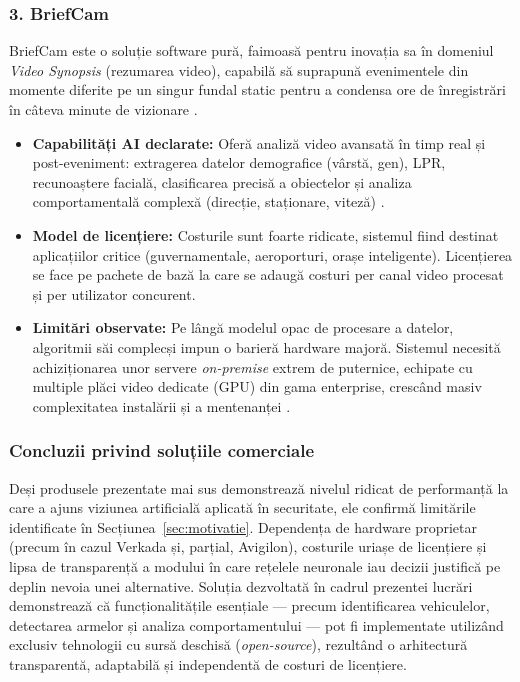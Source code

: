 \documentclass[../../main.tex]{subfiles}
\begin{document}
\subsubsection*{3. BriefCam}
BriefCam este o soluție software pură, faimoasă pentru inovația sa în domeniul \emph{Video Synopsis} (rezumarea video), capabilă să suprapună evenimentele din momente diferite pe un singur fundal static pentru a condensa ore de înregistrări în câteva minute de vizionare \cite{briefcam_datasheet}.
\begin{itemize}
	\item \textbf{Capabilități AI declarate:} Oferă analiză video avansată în timp real și post-eveniment: extragerea datelor demografice (vârstă, gen), LPR, recunoaștere facială, clasificarea precisă a obiectelor și analiza comportamentală complexă (direcție, staționare, viteză) \cite{briefcam_datasheet}.
	\item \textbf{Model de licențiere:} Costurile sunt foarte ridicate, sistemul fiind destinat aplicațiilor critice (guvernamentale, aeroporturi, orașe inteligente). Licențierea se face pe pachete de bază la care se adaugă costuri per canal video procesat și per utilizator concurent.
	\item \textbf{Limitări observate:} Pe lângă modelul opac de procesare a datelor, algoritmii săi complecși impun o barieră hardware majoră. Sistemul necesită achiziționarea unor servere \emph{on-premise} extrem de puternice, echipate cu multiple plăci video dedicate (GPU) din gama enterprise, crescând masiv complexitatea instalării și a mentenanței \cite{briefcam_hardware}.
\end{itemize}

\subsubsection*{Concluzii privind soluțiile comerciale}
Deși produsele prezentate mai sus demonstrează nivelul ridicat de performanță la care a ajuns viziunea artificială aplicată în securitate, ele confirmă limitările identificate în Secțiunea~\ref{sec:motivatie}. Dependența de hardware proprietar (precum în cazul Verkada și, parțial, Avigilon), costurile uriașe de licențiere și lipsa de transparență a modului în care rețelele neuronale iau decizii justifică pe deplin nevoia unei alternative. Soluția dezvoltată în cadrul prezentei lucrări demonstrează că funcționalitățile esențiale — precum identificarea vehiculelor, detectarea armelor și analiza comportamentului — pot fi implementate utilizând exclusiv tehnologii cu sursă deschisă (\emph{open-source}), rezultând o arhitectură transparentă, adaptabilă și independentă de costuri de licențiere.
\end{document}
